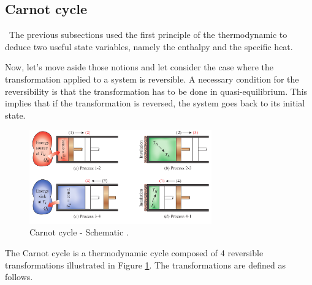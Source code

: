 \subsection{Carnot cycle}
\quad\, The previous subsections used the first principle of the thermodynamic to deduce two useful state variables, namely the enthalpy and the specific heat.

Now, let’s move aside those notions and let consider the case where the transformation applied to a system is reversible. A necessary condition for the reversibility is that the transformation has to be done in quasi-equilibrium. This implies that if the transformation is reversed, the system goes back to its initial state.

\begin{figure}[h]
\centering
\includegraphics[width=0.7\textwidth]{Carnot_schema.png}
\caption{Carnot cycle - Schematic \cite{2015}.}
\label{fig:C3_Carnot}
\end{figure}

The Carnot cycle is a thermodynamic cycle composed of 4 reversible transformations illustrated in Figure \ref{fig:C3_Carnot}. The transformations are defined as follows.

